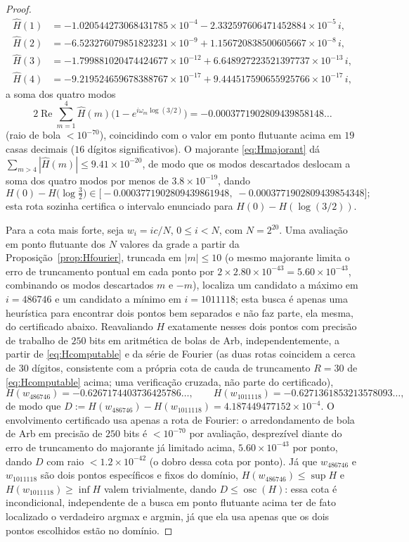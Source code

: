 \documentclass[11pt]{amsart}
\theoremstyle{plain}
\theoremstyle{definition}
\theoremstyle{remark}
\begin{document}
\begin{proof}
\begin{align*}
\hat H(1) &= -1.020544273068431785\times10^{-4} - 2.332597606471452884\times10^{-5}\,i,\\
\hat H(2) &= -6.523276079851823231\times10^{-9} + 1.156720838500605667\times10^{-8}\,i,\\
\hat H(3) &= -1.799881020474424677\times10^{-12} + 6.648927223521397737\times10^{-13}\,i,\\
\hat H(4) &= -9.219524659678388767\times10^{-17} + 9.444517590655925766\times10^{-17}\,i,
\end{align*}
a soma dos quatro modos
\[
2\operatorname{Re}\sum_{m=1}^4\hat H(m)\bigl(1-e^{i\omega_m\log(3/2)}\bigr)
= -0.0003771902809439858148\ldots
\]
(raio de bola $<10^{-70}$), coincidindo com o valor em ponto flutuante acima em $19$ casas decimais
($16$ dígitos significativos). O majorante \eqref{eq:Hmajorant} dá
$\sum_{m>4}|\hat H(m)| \le 9.41\times10^{-20}$, de modo que os modos descartados deslocam a soma dos
quatro modos por menos de $3.8\times10^{-19}$, dando
\[
H(0)-H\bigl(\log\tfrac32\bigr) \in \bigl[-0.0003771902809439861948,\; -0.0003771902809439854348\bigr];
\]
esta rota sozinha certifica o intervalo enunciado para $H(0)-H(\log(3/2))$.

Para a cota mais forte, seja $w_i = ic/N$, $0\le i<N$, com $N = 2^{20}$. Uma avaliação em ponto
flutuante dos $N$ valores da grade a partir da Proposição~\ref{prop:Hfourier}, truncada em
$|m|\le10$ (o mesmo majorante limita o erro de truncamento pontual em cada ponto por
$2\times2.80\times10^{-43}=5.60\times10^{-43}$, combinando os modos descartados $m$ e $-m$), localiza
um candidato a máximo em $i=486746$ e um candidato a mínimo em $i=1011118$; esta busca é apenas uma
heurística para encontrar dois pontos bem separados e não faz parte, ela mesma, do certificado
abaixo. Reavaliando $H$ exatamente nesses dois pontos com precisão de trabalho de $250$ bits em
aritmética de bolas de Arb, independentemente, a partir de \eqref{eq:Hcomputable} e da série de
Fourier (as duas rotas coincidem a cerca de $30$ dígitos, consistente com a própria cota de cauda de
truncamento $R=30$ de \eqref{eq:Hcomputable} acima; uma verificação cruzada, não parte do
certificado),
\[
H(w_{486746}) = -0.6267174403736425786\ldots, \qquad H(w_{1011118}) = -0.6271361853213578093\ldots,
\]
de modo que $D := H(w_{486746})-H(w_{1011118}) = 4.187449477152\times10^{-4}$. O envolvimento
certificado usa apenas a rota de Fourier: o arredondamento de bola de Arb em precisão de $250$
bits é $<10^{-70}$ por avaliação, desprezível diante do erro de truncamento do majorante já
limitado acima, $5.60\times10^{-43}$ por ponto, dando $D$ com raio $<1.2\times10^{-42}$ (o dobro
dessa cota por ponto). Já que $w_{486746}$ e $w_{1011118}$ são dois pontos específicos e fixos do
domínio, $H(w_{486746})\le\sup H$ e $H(w_{1011118})\ge\inf H$ valem trivialmente, dando
$D\le\operatorname{osc}(H)$: essa cota é incondicional, independente de a busca em ponto flutuante
acima ter de fato localizado o verdadeiro argmax e argmin, já que ela usa apenas que os dois pontos
escolhidos estão no domínio.


\end{proof}
\end{document}
